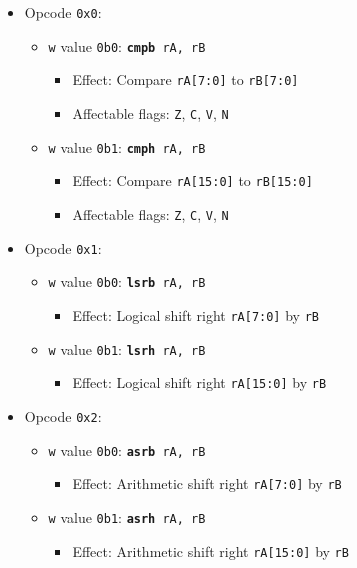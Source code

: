 \documentclass{article}
\begin{document}
	\singlespacing
	\begin{itemize}
	\item Opcode \texttt{0x0}:
		\begin {itemize}
		\item \texttt{w} value \texttt{0b0}:
			\texttt{\textbf{cmpb} rA, rB}
			\begin{itemize}
			\item Effect: Compare \texttt{rA[7:0]} to \texttt{rB[7:0]}
			\item Affectable flags:
				\texttt{Z}, \texttt{C}, \texttt{V}, \texttt{N}
			\end{itemize}
		\item \texttt{w} value \texttt{0b1}:
			\texttt{\textbf{cmph} rA, rB}
			\begin{itemize}
			\item Effect: Compare \texttt{rA[15:0]} to \texttt{rB[15:0]}
			\item Affectable flags:
				\texttt{Z}, \texttt{C}, \texttt{V}, \texttt{N}
			\end{itemize}
		\end{itemize}
	\item Opcode \texttt{0x1}:
		\begin {itemize}
		\item \texttt{w} value \texttt{0b0}:
			\texttt{\textbf{lsrb} rA, rB}
			\begin{itemize}
			\item Effect:
				Logical shift right \texttt{rA[7:0]} by \texttt{rB}
			\end{itemize}
		\item \texttt{w} value \texttt{0b1}:
			\texttt{\textbf{lsrh} rA, rB}
			\begin{itemize}
			\item Effect:
				Logical shift right \texttt{rA[15:0]} by \texttt{rB}
			\end{itemize}
		\end{itemize}
	\item Opcode \texttt{0x2}:
		\begin {itemize}
		\item \texttt{w} value \texttt{0b0}:
			\texttt{\textbf{asrb} rA, rB}
			\begin{itemize}
			\item Effect:
				Arithmetic shift right
				\texttt{rA[7:0]} by \texttt{rB}
			\end{itemize}
		\item \texttt{w} value \texttt{0b1}:
			\texttt{\textbf{asrh} rA, rB}
			\begin{itemize}
			\item Effect:
				Arithmetic shift right
					\texttt{rA[15:0]} by \texttt{rB}
			\end{itemize}
		\end{itemize}
	\end{itemize}


\end{document}
